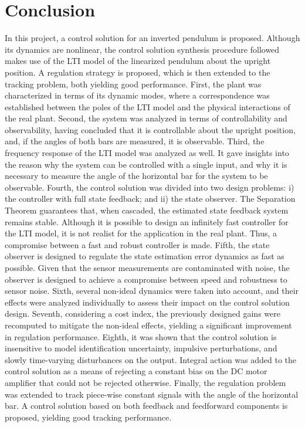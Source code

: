 \documentclass[letterpaper, 10 pt, conference]{ieeeconf}
\begin{document}
\section{Conclusion}\label{sec:concl}
In this project, a control solution for an inverted pendulum is proposed. Although its dynamics are nonlinear, the control solution synthesis procedure followed makes use of the LTI model of the linearized pendulum about the upright position. A regulation strategy is proposed, which is then extended to the tracking problem, both yielding good performance. First, the plant was characterized in terms of its dynamic modes, where a correspondence was established between the poles of the LTI model and the physical interactions of the real plant. Second, the system was analyzed in terms of controllability and observability, having concluded that it is controllable about the upright position, and, if the angles of both bars are measured, it is observable. Third, the frequency response of the LTI model was analyzed as well. It gave insights into the reason why the system can be controlled with a single input, and why it is necessary to measure the angle of the horizontal bar for the system to be observable. Fourth, the control solution was divided into two design problems: i) the controller with full state feedback; and ii) the state observer. The Separation Theorem guarantees that, when cascaded, the estimated state feedback system remains stable. Although it is possible to design an infinitely fast controller for the LTI model, it is not realist for the application in the real plant. Thus, a compromise between a fast and robust controller is made. Fifth, the state observer is designed to regulate the state estimation error dynamics as fast as possible. Given that the sensor measurements are contaminated with noise, the observer is designed to achieve a compromise between speed and robustness to sensor noise. Sixth, several non-ideal dynamics were taken into account, and their effects were analyzed individually to assess their impact on the control solution design. Seventh, considering a cost index, the previously designed gains were recomputed to mitigate the non-ideal effects, yielding a significant improvement in regulation performance. Eighth, it was shown that the control solution is insensitive to model identification uncertainty, impulsive perturbations, and slowly time-varying disturbances on the output. Integral action was added to the control solution as a means of rejecting a constant bias on the DC motor amplifier that could not be rejected otherwise. Finally, the regulation problem was extended to track piece-wise constant signals with the angle of the horizontal bar. A control solution based on both feedback and feedforward components is proposed, yielding good tracking performance.

\printbibliography
\end{document}
